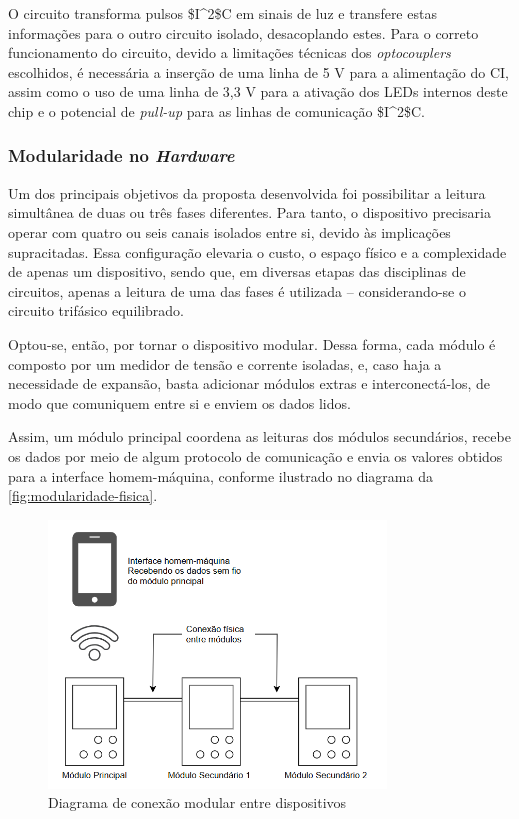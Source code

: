 O circuito transforma pulsos \gls{$I^2$C} em sinais de luz e transfere estas informações para o outro circuito isolado, desacoplando estes. Para o correto funcionamento do circuito, devido a limitações técnicas dos \textit{optocouplers} escolhidos, é necessária a inserção de uma linha de 5 V para a alimentação do \gls{CI}, assim como o uso de uma linha de 3,3 V para a ativação dos LEDs internos deste chip e o potencial de \textit{pull-up} para as linhas de comunicação \gls{$I^2$C}.

\subsubsection{Modularidade no \textit{Hardware}}\label{modularidade-metodologia}

Um dos principais objetivos da proposta desenvolvida foi possibilitar a leitura simultânea de duas ou três fases diferentes. Para tanto, o dispositivo precisaria operar com quatro ou seis canais isolados entre si, devido às implicações supracitadas. Essa configuração elevaria o custo, o espaço físico e a complexidade de apenas um dispositivo, sendo que, em diversas etapas das disciplinas de circuitos, apenas a leitura de uma das fases é utilizada – considerando-se o circuito trifásico equilibrado.

Optou-se, então, por tornar o dispositivo modular. Dessa forma, cada módulo é composto por um medidor de tensão e corrente isoladas, e, caso haja a necessidade de expansão, basta adicionar módulos extras e interconectá-los, de modo que comuniquem entre si e enviem os dados lidos.

Assim, um módulo principal coordena as leituras dos módulos secundários, recebe os dados por meio de algum protocolo de comunicação e envia os valores obtidos para a interface homem-máquina, conforme ilustrado no diagrama da \autoref{fig:modularidade-fisica}.

\begin{figure}[htb!]
    \caption{Diagrama de conexão modular entre dispositivos}
    \vspace*{5mm}
    \label{fig:modularidade-fisica}
    \includegraphics[width=0.8\textwidth]{figuras/mod-fisica.png}
    \fonte{}
\end{figure}

